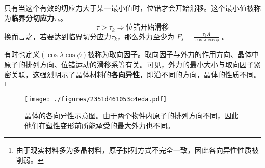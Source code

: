 只有当这个有效的切应力大于某一最小值时，位错才会开始滑移。这个最小值被称为\textbf{临界分切应力$\tau_k$}。
$$
\tau>\tau_k\Rightarrow\text{位错开始滑移}
$$
换而言之，若要达到临界切分应力$\tau_k$，那么外力至少为 $F_s=\frac{\tau_k A}{\cos \lambda \cos \phi} $ 。

有时也定义$(\cos \lambda \cos \phi)$被称为取向因子。取向因子与外力的作用方向、晶体中原子的排列方向、位错运动的滑移系等有关。可见，外力的最小大小与取向因子紧密关联，这强烈明示了晶体材料的\textbf{各向异性}，即沿不同的方向，晶体的性质不同。\footnote{由于现实材料多为多晶材料，原子排列方式不完全一致，因此各向异性性质被削弱。}

\begin{figure}[ht]
\centering
\texttt{[image: ./figures/2351d461053c4eda.pdf]}
\caption{晶体的各向异性示意图。由于两个物件内原子的排列方向不同，因此他们在塑性变形前所能承受的最大外力也不同。} \label{fig_MetDfm_9}
\end{figure}
